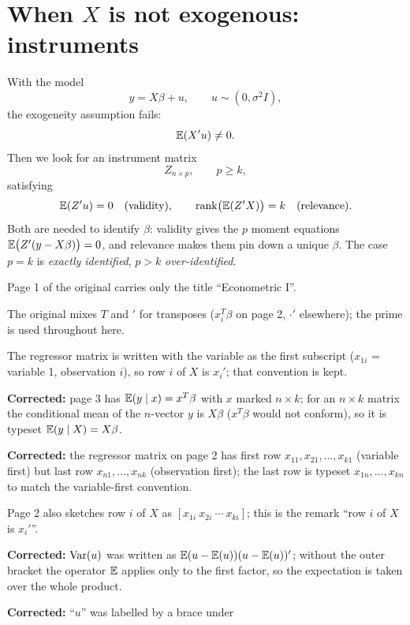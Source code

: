 \documentclass[11pt]{article}
\begin{document}
\section{When $X$ is not exogenous: instruments}

With the model
\[ y=X\beta+u,\qquad u\sim(0,\sigma^2I), \]
the exogeneity assumption fails:
\[ \mathbb{E}(X'u)\ne0 . \]
Then we look for an instrument matrix
\[ Z_{n\times p},\qquad p\ge k, \]
satisfying
\[ \mathbb{E}(Z'u)=0 \quad\text{(validity)},\qquad \operatorname{rank}\bigl(\mathbb{E}(Z'X)\bigr)=k
   \quad\text{(relevance)} . \]
Both are needed to identify $\beta$: validity gives the $p$ moment equations
$\mathbb{E}\bigl(Z'(y-X\beta)\bigr)=0$, and relevance makes them pin down a unique $\beta$.
The case $p=k$ is \emph{exactly identified}, $p>k$ \emph{over-identified}.

\begin{transcriptnotes}
  \item Page 1 of the original carries only the title ``Econometric I''.
  \item The original mixes $T$ and $'$ for transposes ($x_i^T\beta$ on page 2,
        $\cdot'$ elsewhere); the prime is used throughout here.
  \item The regressor matrix is written with the variable as the first subscript
        ($x_{1i}$ = variable 1, observation $i$), so row $i$ of $X$ is $x_i'$;
        that convention is kept.
  \item \textbf{Corrected:} page 3 has $\mathbb{E}(y\mid x)=x^{T}\beta$ with $x$ marked
        $n\times k$; for an $n\times k$ matrix the conditional mean of the $n$-vector
        $y$ is $X\beta$ ($x^T\beta$ would not conform), so it is typeset
        $\mathbb{E}(y\mid X)=X\beta$.
  \item \textbf{Corrected:} the regressor matrix on page 2 has first row
        $x_{11},x_{21},\dots,x_{k1}$ (variable first) but last row
        $x_{n1},\dots,x_{nk}$ (observation first); the last row is typeset
        $x_{1n},\dots,x_{kn}$ to match the variable-first convention.
  \item Page 2 also sketches row $i$ of $X$ as $[x_{1i}\ x_{2i}\ \cdots\ x_{ki}]$;
        this is the remark ``row $i$ of $X$ is $x_i'$''.
  \item \textbf{Corrected:} $\operatorname{Var}(u)$ was written as
        $\mathbb{E}(u-\mathbb{E}(u))(u-\mathbb{E}(u))'$; without the outer bracket the operator $\mathbb{E}$
        applies only to the first factor, so the expectation is taken over the whole
        product.
  \item \textbf{Corrected:} ``$u$'' was labelled by a brace under

\end{transcriptnotes}
\end{document}
